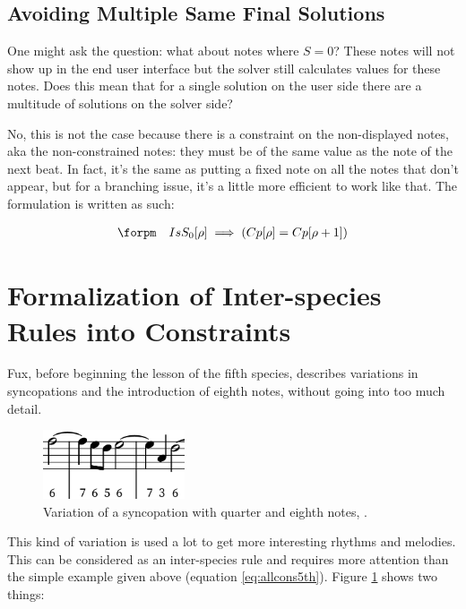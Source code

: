 \subsection{Avoiding Multiple Same Final Solutions}
One might ask the question: what about notes where $S = 0$? These notes will not show up in the end user interface but the solver still calculates values for these notes. Does this mean that for a single solution on the user side there are a multitude of solutions on the solver side?

No, this is not the case because there is a constraint on the non-displayed notes, aka the non-constrained notes: they must be of the same value as the note of the next beat. In fact, it's the same as putting a fixed note on all the notes that don't appear, but for a branching issue, it's a little more efficient to work like that. The formulation is written as such:

\begin{equation}
    \begin{gathered}
        \forpm\quad
        IsS_{0}[\rho] \implies (Cp[\rho] = Cp[\rho + 1])
    \end{gathered}
\end{equation}

\section{Formalization of Inter-species Rules into Constraints}
Fux, before beginning the lesson of the fifth species, describes variations in syncopations and the introduction of eighth notes, without going into too much detail. \textcite[p.85]{GaPFr}

\begin{figure}[h]
    \centering
    \includegraphics[height=0.8in]{Images/syncope_variations.png}
    \caption{Variation of a syncopation with quarter and eighth notes, .}
    \label{fig:syncopevariation}
\end{figure}

This kind of variation is used a lot to get more interesting rhythms and melodies. This can be considered as an inter-species rule and requires more attention than the simple example given above (equation \ref{eq:allcons5th}). Figure \ref{fig:syncopevariation} shows two things:

